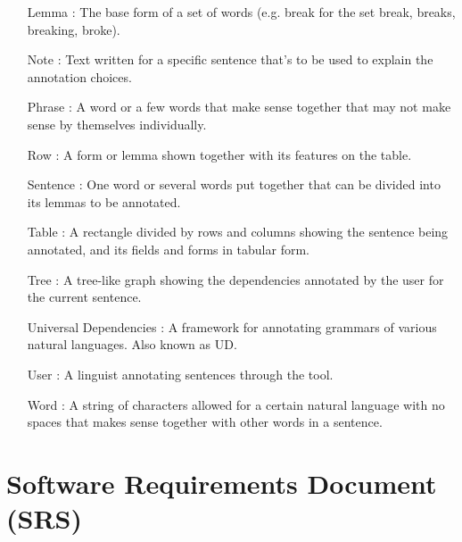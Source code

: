 \begin{itemize}[before=\normalfont, font=\itshape, align=left]
    \item[Lemma]: The base form of a set of words (e.g. break for the set {break, breaks, breaking, broke}).

    \item[Note]: Text written for a specific sentence that's to be used to explain the annotation choices.

    \item[Phrase]: A word or a few words that make sense together that may not make sense by themselves individually.

    \item[Row]: A form or lemma shown together with its features on the table.

    \item[Sentence]: One word or several words put together that can be divided into its lemmas to be annotated.

    \item[Table]: A rectangle divided by rows and columns showing the sentence being annotated, and its fields and forms in tabular form.

    \item[Tree]: A tree-like graph showing the dependencies annotated by the user for the current sentence.

    \item[Universal Dependencies]: A framework for annotating grammars of various natural languages. Also known as UD.

    \item[User]: A linguist annotating sentences through the tool.

    \item[Word]: A string of characters allowed for a certain natural language with no spaces that makes sense together with other words in a sentence.

\end{itemize}

\section{Software Requirements Document (SRS)}


